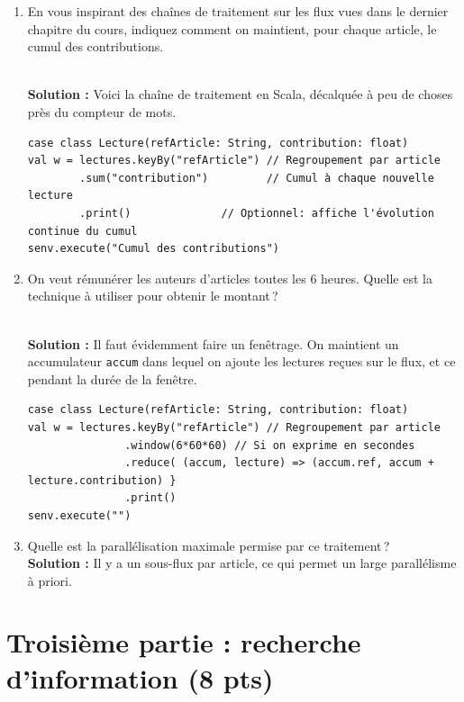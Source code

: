 \documentclass[11pt,a4paper]{article}
\newenvironment{solution}[0]{
~\\ \color{red} \textbf{Solution : }\color{black}}{%
}
\begin{document}
\begin{enumerate}
\item En vous inspirant des chaînes de traitement sur les flux vues dans le dernier chapitre
du cours, indiquez comment on maintient, pour chaque article, le cumul des contributions.

\begin{solution}
Voici la chaîne de traitement en Scala, décalquée à peu de choses près du compteur de mots.
\begin{small}
\begin{verbatim}
case class Lecture(refArticle: String, contribution: float)
val w = lectures.keyBy("refArticle") // Regroupement par article
        .sum("contribution")         // Cumul à chaque nouvelle lecture
        .print()              // Optionnel: affiche l'évolution continue du cumul
senv.execute("Cumul des contributions")
\end{verbatim}
\end{small}
\end{solution}

\item On veut rémunérer les auteurs d'articles toutes les 6 heures. Quelle est 
   la technique à utiliser pour obtenir le montant\,?
   
\begin{solution}
Il faut évidemment faire un fenêtrage. On maintient un accumulateur \texttt{accum}
dans lequel on ajoute les lectures reçues sur le flux, et ce pendant la durée de la fenêtre.
\begin{small}
\begin{verbatim}
case class Lecture(refArticle: String, contribution: float)
val w = lectures.keyBy("refArticle") // Regroupement par article
               .window(6*60*60) // Si on exprime en secondes
               .reduce( (accum, lecture) => (accum.ref, accum + lecture.contribution) }
               .print()
senv.execute("")
\end{verbatim}
\end{small}
\end{solution}

  \item Quelle est la parallélisation maximale permise par ce traitement\,?
\begin{solution}
Il y a un sous-flux par article, ce qui permet un large parallélisme à priori.
\end{solution}
\end{enumerate}

\section*{Troisième partie : recherche d'information (8 pts)}
\end{document}
